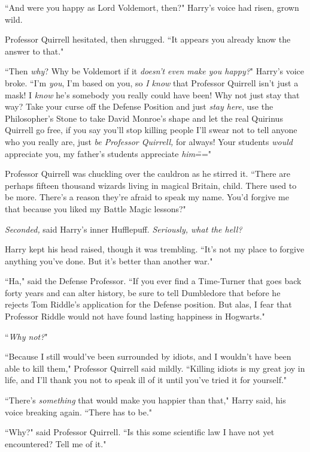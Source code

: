 ``And were you happy as Lord Voldemort, then?" Harry's voice had risen, grown wild.

Professor Quirrell hesitated, then shrugged. ``It appears you already know the answer to that."

``Then \emph{why}? Why be Voldemort if it \emph{doesn't even make you happy?}" Harry's voice broke. ``I'm \emph{you}, I'm based on you, so \emph{I know} that Professor Quirrell isn't just a mask! I \emph{know} he's somebody you really could have been! Why not just stay that way? Take your curse off the Defense Position and just \emph{stay here}, use the Philosopher's Stone to take David Monroe's shape and let the real Quirinus Quirrell go free, if you say you'll stop killing people I'll swear not to tell anyone who you really are, just \emph{be Professor Quirrell,} for always! Your students \emph{would} appreciate you, my father's students appreciate \emph{him}\==="

Professor Quirrell was chuckling over the cauldron as he stirred it. ``There are perhaps fifteen thousand wizards living in magical Britain, child. There used to be more. There's a reason they're afraid to speak my name. You'd forgive me that because you liked my Battle Magic lessons?"

\emph{Seconded,} said Harry's inner Hufflepuff. \emph{Seriously, what the hell?}

Harry kept his head raised, though it was trembling. ``It's not my place to forgive anything you've done. But it's better than another war."

``Ha," said the Defense Professor. ``If you ever find a Time-Turner that goes back forty years and can alter history, be sure to tell Dumbledore that before he rejects Tom Riddle's application for the Defense position. But alas, I fear that Professor Riddle would not have found lasting happiness in Hogwarts."

``\emph{Why not?}"

``Because I still would've been surrounded by idiots, and I wouldn't have been able to kill them," Professor Quirrell said mildly. ``Killing idiots is my great joy in life, and I'll thank you not to speak ill of it until you've tried it for yourself."

``There's \emph{something} that would make you happier than that," Harry said, his voice breaking again. ``There has to be."

``Why?" said Professor Quirrell. ``Is this some scientific law I have not yet encountered? Tell me of it."

